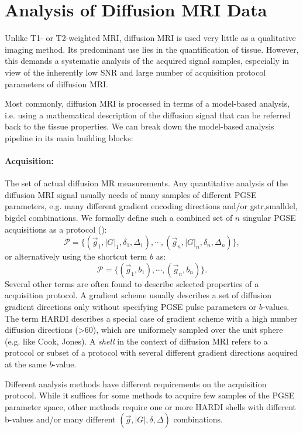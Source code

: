 \section{Analysis of Diffusion MRI Data}
Unlike T1- or T2-weighted MRI, diffusion MRI is used very little as a qualitative imaging method. Its predominant use lies in the quantification of tissue. However, this demands a systematic analysis of the acquired signal samples, especially in view of the inherently low SNR and large number of acquisition protocol parameters of diffusion MRI.


Most commonly, diffusion MRI is processed in terms of a model-based analysis, i.e. using a mathematical description of the diffusion signal that can be referred back to the tissue properties. We can break down the model-based analysis pipeline in its main building blocks: 
\paragraph{Acquisition:} The set of actual diffusion MR measurements. Any quantitative analysis of the diffusion MRI signal usually needs of many samples of different PGSE parameters, e.g. many different gradient encoding directions and/or \gls{gstr},\gls{smalldel}, \gls{bigdel} combinations. We formally define such a combined set of $n$ singular PGSE acquisitions as a protocol (\prot):
\begin{equation}
	\mathcal{P} = \{(\vec{g}_1,|G|_1,\delta_1,\Delta_1),\cdots,(\vec{g}_n,|G|_n,\delta_n,\Delta_n)\},
\end{equation}
or alternatively using the shortcut term $b$ as:
\begin{equation*}		
	\mathcal{P} = \{(\vec{g}_1,b_1),\cdots,(\vec{g}_n,b_n)\}.
\end{equation*}
Several other terms are often found to describe selected properties of a acquisition protocol. A gradient scheme usually describes a set of diffusion gradient directions only without specifying PGSE pulse parameters or $b$-values. The term \gls{HARDI} describes a special case of gradient scheme with a high number diffusion directions (>60), which are uniformely sampled over the unit sphere (e.g. like Cook, Jones). A \textit{shell} in the context of diffusion MRI refers to a protocol or subset of a protocol with several different gradient directions acquired at the same $b$-value. 


Different analysis methods have different requirements on the acquisition protocol. While it suffices for some methods to acquire few samples of the PGSE parameter space, other methods require one or more HARDI shells with different b-values and/or many different $(\vec{g},|G|,\delta,\Delta)$ combinations. 


